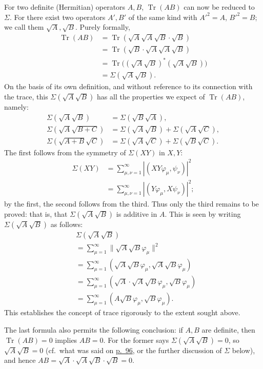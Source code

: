 \documentclass[fontsize=13pt,twoside,openany,headings=normal,parskip=false,bookmarkpackage=false,DIV=calc]{scrbook}
\begin{document}
For two definite (Hermitian) operators $A,B$, $\operatorname{Tr}(AB)$ can now be reduced to $\Sigma$. For there exist two operators $A',B'$ of the same kind with $A'^2=A$, $B'^2=B$; we call them $\sqrt A,\sqrt B$. Purely formally,
\begin{align*}
\operatorname{Tr}(AB)
&=\operatorname{Tr}(\sqrt A\sqrt A\sqrt B\cdot\sqrt B)\\
&=\operatorname{Tr}(\sqrt B\cdot\sqrt A\sqrt A\sqrt B)\\
&=\operatorname{Tr}\bigl((\sqrt A\sqrt B)^*(\sqrt A\sqrt B)\bigr)\\
&=\Sigma(\sqrt A\sqrt B).
\end{align*}
On the basis of its own definition, and without reference to its connection with the trace, this $\Sigma(\sqrt A\sqrt B)$ has all the properties we expect of $\operatorname{Tr}(AB)$, namely:
\begin{align*}
\Sigma(\sqrt A\sqrt B)&=\Sigma(\sqrt B\sqrt A),\\
\Sigma(\sqrt A\sqrt{B+C})&=\Sigma(\sqrt A\sqrt B)+\Sigma(\sqrt A\sqrt C),\\
\Sigma(\sqrt{A+B}\sqrt C)&=\Sigma(\sqrt A\sqrt C)+\Sigma(\sqrt B\sqrt C).
\end{align*}
The first follows from the symmetry of $\Sigma(XY)$ in $X,Y$:
\begin{align*}
\Sigma(XY)&=\sum_{\mu,\nu=1}^{\infty}|(XY\varphi_\mu,\psi_\nu)|^2\\
&=\sum_{\mu,\nu=1}^{\infty}|(Y\varphi_\mu,X\psi_\nu)|^2;
\end{align*}
by the first, the second follows from the third. Thus only the third remains to be proved: that is, that $\Sigma(\sqrt A\sqrt B)$ is additive in $A$. This is seen by writing $\Sigma(\sqrt A\sqrt B)$ as follows:
\begin{align*}
&\Sigma(\sqrt A\sqrt B)\\
&=\sum_{\mu=1}^{\infty}\|\sqrt A\sqrt B\varphi_\mu\|^2\\
&=\sum_{\mu=1}^{\infty}(\sqrt A\sqrt B\varphi_\mu,\sqrt A\sqrt B\varphi_\mu)\\
&=\sum_{\mu=1}^{\infty}(\sqrt A\cdot\sqrt A\sqrt B\varphi_\mu,\sqrt B\varphi_\mu)\\
&=\sum_{\mu=1}^{\infty}(A\sqrt B\varphi_\mu,\sqrt B\varphi_\mu).
\end{align*}
This establishes the concept of trace rigorously to the extent sought above.

The last formula also permits the following conclusion: if $A,B$ are definite, then $\operatorname{Tr}(AB)=0$ implies $AB=0$. For the former says $\Sigma(\sqrt A\sqrt B)=0$, so $\sqrt A\sqrt B=0$ (cf.\ what was said on \hyperlink{origpage-96}{p.~96}, or the further discussion of $\Sigma$ below), and hence $AB=\sqrt A\cdot\sqrt A\sqrt B\cdot\sqrt B=0$.
\end{document}
